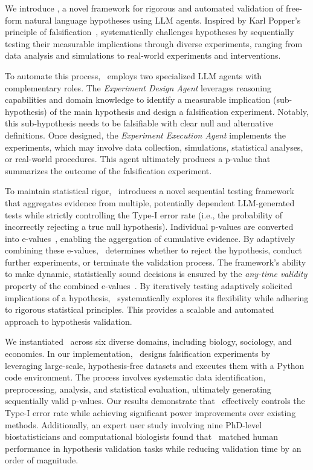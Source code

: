 \vspace{-0.5em}
We introduce \mname, a novel framework for rigorous and automated validation of free-form natural language hypotheses using LLM agents. Inspired by Karl Popper's principle of falsification~\cite{popper2005logic}, \mname systematically challenges hypotheses by sequentially testing their measurable implications through diverse experiments, ranging from data analysis and simulations to real-world experiments and interventions.

To automate this process, \mname\ employs two specialized LLM agents with complementary roles. The \emph{Experiment Design Agent} leverages reasoning capabilities and domain knowledge to identify a measurable implication (sub-hypothesis) of the main hypothesis and design a falsification experiment. Notably, this sub-hypothesis needs to be falsifiable with clear null and alternative definitions. 
Once designed, the \emph{Experiment Execution Agent} implements the experiments, which may involve data collection, simulations, statistical analyses, or real-world procedures. This agent ultimately produces a p-value that summarizes the outcome of the falsification experiment.

To maintain statistical rigor, \mname\ introduces a novel sequential testing framework that aggregates evidence from multiple, potentially dependent LLM-generated tests while strictly controlling the Type-I error rate (i.e., the probability of incorrectly rejecting a true null hypothesis). Individual p-values are converted into e-values~\cite{vovk2021values}, enabling the aggergation of cumulative evidence. By adaptively combining these e-values, \mname\ determines whether to reject the hypothesis, conduct further experiments, or terminate the validation process. The framework's ability to make dynamic, statistically sound decisions is ensured by the \emph{any-time validity} property of the combined e-values~\cite{grunwald2020safe}.
By iteratively testing adaptively solicited implications of a hypothesis, \mname\ systematically explores its flexibility while adhering to rigorous statistical principles. This provides a scalable and automated approach to hypothesis validation.

We instantiated \mname\ across six diverse domains, including biology, sociology, and economics. In our implementation, \mname\ designs falsification experiments by leveraging large-scale, hypothesis-free datasets and executes them with a Python code environment. The process involves systematic data identification, preprocessing, analysis, and statistical evaluation, ultimately generating sequentially valid p-values. Our results demonstrate that \mname\ effectively controls the Type-I error rate while achieving significant power improvements over existing methods. Additionally, an expert user study involving nine PhD-level biostatisticians and computational biologists found that \mname\ matched human performance in hypothesis validation tasks while reducing validation time by an order of magnitude. 








